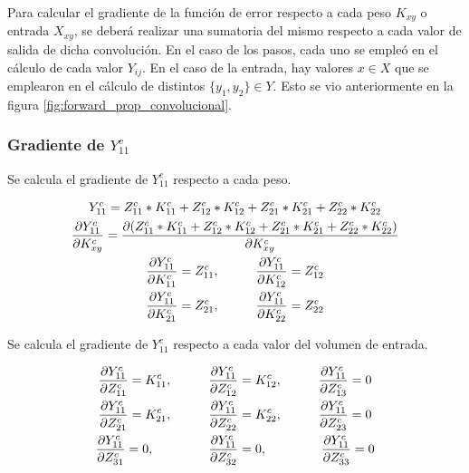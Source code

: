 Para calcular el gradiente de la función de error respecto a cada peso $K_{xy}$ o entrada $X_{xy}$, se deberá realizar una sumatoria del mismo respecto a cada valor de salida de dicha convolución. En el caso de los pasos, cada uno se empleó en el cálculo de cada valor $Y_{ij}$. En el caso de la entrada, hay valores $x \in X $ que se emplearon en el cálculo de distintos $\{y_1, y_2\} \in Y$. Esto se vio anteriormente en la figura \ref{fig:forward_prop_convolucional}.

\subsubsection{Gradiente de $Y^c_{11}$}

Se calcula el gradiente de $Y^c_{11}$ respecto a cada peso.

\begin{gather}
	Y^c_{11} = Z^c_{11} * K^c_{11} + Z^c_{12} * K^c_{12} + Z^c_{21} * K^c_{21} + Z^c_{22} * K^c_{22} \\
	\frac{\partial Y^c_{11}}{\partial K^c_{xy}} = \frac{\partial (Z^c_{11} * K^c_{11} + Z^c_{12} * K^c_{12} + Z^c_{21} * K^c_{21} + Z^c_{22} * K^c_{22})}{\partial K^c_{xy}} \\
	\frac{\partial Y^c_{11}}{\partial K^c_{11}} = Z^c_{11}, \hspace{10mm} \frac{\partial Y^c_{11}}{\partial K^c_{12}} = Z^c_{12}\\
	\frac{\partial Y^c_{11}}{\partial K^c_{21}} = Z^c_{21}, \hspace{10mm} \frac{\partial Y^c_{11}}{\partial K^c_{22}} = Z^c_{22}
\end{gather}

Se calcula el gradiente de $Y^c_{11}$ respecto a cada valor del volumen de entrada.

\begin{gather}
	\frac{\partial Y^c_{11}}{\partial Z^c_{11}} = K^c_{11}, \hspace{10mm} \frac{\partial Y^c_{11}}{\partial Z^c_{12}} = K^c_{12}, \hspace{10mm} \frac{\partial Y^c_{11}}{\partial Z^c_{13}} = 0\\
	\frac{\partial Y^c_{11}}{\partial Z^c_{21}} = K^c_{21}, \hspace{10mm} \frac{\partial Y^c_{11}}{\partial Z^c_{22}} = K^c_{22}, \hspace{10mm} \frac{\partial Y^c_{11}}{\partial Z^c_{23}} = 0\\
	\frac{\partial Y^c_{11}}{\partial Z^c_{31}} = 0, \hspace{15mm} \frac{\partial Y^c_{11}}{\partial Z^c_{32}} = 0, \hspace{15mm} \frac{\partial Y^c_{11}}{\partial Z^c_{33}} = 0
\end{gather}

